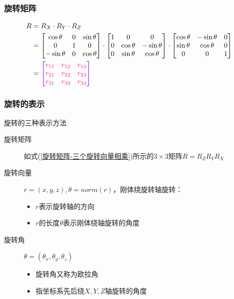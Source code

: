 \documentclass[aspectratio=43]{beamer}
\begin{document}
\begin{frame}
	\frametitle{旋转矩阵}

		\begin{align}
			R&=R_X\cdot R_Y\cdot R_Z  \label{旋转矩阵-三个旋转向量相乘}
			\\
			&=\left[ \begin{matrix}
				\cos \theta&		0&		\sin \theta\\
				0&		1&		0\\
				-\sin \theta&		0&		\cos \theta\\
			\end{matrix} \right] \cdot \left[ \begin{matrix}
				1&		0&		0\\
				0&		\cos \theta&		-\sin \theta\\
				0&		\sin \theta&		\cos \theta\\
			\end{matrix} \right] \cdot \left[ \begin{matrix}
				\cos \theta&		-\sin \theta&		0\\
				\sin \theta&		\cos \theta&		0\\
				0&		0&		1\\
			\end{matrix} \right]  \nonumber
			\\
			&={\color[RGB]{128, 0, 255} \left[ {\color[RGB]{255, 0, 128} \begin{matrix}
						r_{11}&		r_{12}&		r_{13}\\
						r_{21}&		r_{22}&		r_{23}\\
						r_{31}&		r_{32}&		r_{33}\\
				\end{matrix}} \right] } \label{旋转矩阵-抽象形式}
		\end{align}	
	
\end{frame}

	\begin{frame}
	\frametitle{旋转的表示}
	\begin{block}{旋转的三种表示方法}
	\begin{description}
		\item[旋转矩阵] 如式(\ref{旋转矩阵-三个旋转向量相乘})所示的$3\times 3$矩阵$R=R_ZR_YR_X$
		\item[旋转向量] $r=\left( x,y,z \right) ,\theta =norm\left( r \right) $，刚体绕旋转轴旋转：
		\begin{itemize}
			\item $r$表示旋转轴的方向
			\item $r$的长度$\theta$表示刚体绕轴旋转的角度
		\end{itemize}
		\item[旋转角] $\theta =\left( \theta _x,\theta _y,\theta _z \right) $
		\begin{itemize}
			\item 旋转角又称为欧拉角
			\item 指坐标系先后绕$X,Y,Z$轴旋转的角度
		\end{itemize}
	\end{description}
	\end{block}
	\end{frame}
\end{document}
